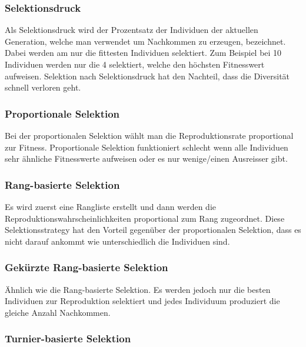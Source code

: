       \subsubsection{Selektionsdruck}

        Als Selektionsdruck wird der Prozentsatz der Individuen der aktuellen Generation,
        welche man verwendet um Nachkommen zu erzeugen, bezeichnet.
        Dabei werden am nur die fittesten Individuen selektiert.
        Zum Beispiel bei 10 Individuen werden nur die 4 selektiert, welche den höchsten Fitnesswert aufweisen.
        Selektion nach Selektionsdruck hat den Nachteil, dass die Diversität schnell verloren geht.

      \subsubsection{Proportionale Selektion}

        Bei der proportionalen Selektion wählt man die Reproduktionsrate proportional zur Fitness.
        Proportionale Selektion funktioniert schlecht wenn alle Individuen sehr ähnliche Fitnesswerte aufweisen oder es nur wenige/einen Ausreisser gibt.

      \subsubsection{Rang-basierte Selektion}

        Es wird zuerst eine Rangliste erstellt und dann werden die Reproduktionswahrscheinlichkeiten proportional zum Rang zugeordnet.
        Diese Selektionsstrategy hat den Vorteil gegenüber der proportionalen Selektion,
        dass es nicht darauf ankommt wie unterschiedlich die Individuen sind.

      \subsubsection{Gekürzte Rang-basierte Selektion}

        Ähnlich wie die Rang-basierte Selektion.
        Es werden jedoch nur die besten Individuen zur Reproduktion selektiert und
        jedes Individuum produziert die gleiche Anzahl Nachkommen.

      \subsubsection{Turnier-basierte Selektion\label{par:Turnier}}

